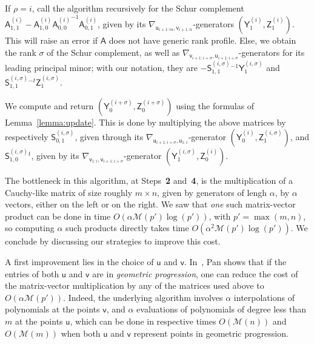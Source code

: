 \documentclass{sig-alternate}
\newcommand{\vu}{\ensuremath{\mathsf{u}}}
\newcommand{\vv}{\ensuremath{\mathsf{v}}}
\newcommand{\mA}{\ensuremath{\mathsf{A}}}
\newcommand{\mS}{\ensuremath{\mathsf{S}}}
\newcommand{\mY}{\ensuremath{\mathsf{Y}}}
\newcommand{\mZ}{\ensuremath{\mathsf{Z}}}
\newcommand{\M}{\ensuremath{\mathscr{M}}}
\begin{document}
\smallskip{} If $\rho=i$, call the algorithm
recursively for the Schur complement $\mA^{(i)}_{1,1} -
\mA^{(i)}_{1,0} {\mA^{(i)}_{0,0}}^{-1} \mA^{(i)}_{0,1}$, given by its
$\nabla_{\vu_{i+1:m},\vv_{i+1:n}}$-generators
$(\mY^{(i)}_1,\mZ^{(i)}_1)$. This will raise an error if $\mA$ does
not have generic rank profile. Else, we obtain the rank $\sigma$ of the
Schur complement, as well as
$\nabla_{\vv_{i+1:i+\sigma},\vu_{i+1:i+\sigma}}$-generators for its
leading principal minor; with our notation, they are
$-\mS^{(i,\sigma)}_{1,1}{}^{-1} \mY^{(i,\sigma)}_1$ and
$\mS^{(i,\sigma)}_{1,1}{}^{-t} \mZ^{(i,\sigma)}_1$.  

\smallskip{}  We compute and return
$(\mY^{(i+\sigma)}_0,\mZ^{(i+\sigma)}_0)$ using the formulas of
Lemma~\ref{lemma:update}.  This is done by multiplying the above
matrices by respectively $\mS^{(i,\sigma)}_{0,1}$, given through its
$\nabla_{\vu_{i+1:i+\sigma},\vu_{1:i}}$-generator
$(\mY^{(i)}_0,\mZ^{(i,\sigma)}_{1})$, and
$\mS^{(i,\sigma)}_{1,0}{}^t$, given by its
$\nabla_{\vv_{1:i},\vv_{i+1:i+\sigma}}$-genera\-tor
$(\mY^{(i,\sigma)}_1,\mZ^{(i)}_0)$.

\medskip

The bottleneck in this algorithm, at Steps~{\bf 2} and~{\bf 4}, is the
multiplication of a Cauchy-like matrix of size roughly $m \times n$,
given by generators of lengh $\alpha$, by $\alpha$ vectors, either on
the left or on the right. We saw that {\em one} such matrix-vector
product can be done in time $O(\alpha \M(p')\log(p'))$, with
$p'=\max(m,n)$, so computing $\alpha$ such products directly takes
time $O(\alpha^2 \M(p')\log(p'))$. We conclude by discussing our
strategies to improve this cost.

A first improvement lies in the choice of $\vu$ and
$\vv$. In~\cite[Theorem~4.7.3]{Pan01}, Pan shows that if the entries
of both $\vu$ and $\vv$ are in {\em geometric progression}, one can
reduce the cost of the matrix-vector multiplication by any of the
matrices used above to $O(\alpha \M(p'))$. Indeed, the underlying
algorithm involves $\alpha$ interpolations of polynomials at the
points $\vv$, and $\alpha$ evaluations of polynomials of degree less
than $m$ at the points $\vu$, which can be done in respective times
$O(\M(n))$ and $O(\M(m))$ when both $\vu$ and $\vv$ represent points
in geometric progression.
\end{document}
